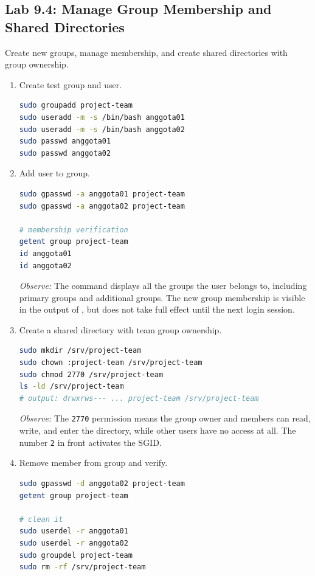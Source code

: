 \subsection*{Lab 9.4: Manage Group Membership and Shared Directories}

Create new groups, manage membership, and create shared directories with group ownership.

\begin{enumerate}
\item Create test group and user.
\begin{lstlisting}[language=bash, caption={Create test groups and users}]
sudo groupadd project-team
sudo useradd -m -s /bin/bash anggota01
sudo useradd -m -s /bin/bash anggota02
sudo passwd anggota01
sudo passwd anggota02
\end{lstlisting}

\item Add user to group.
\begin{lstlisting}[language=bash, caption={Add members to a group}]
sudo gpasswd -a anggota01 project-team
sudo gpasswd -a anggota02 project-team

# membership verification
getent group project-team
id anggota01
id anggota02
\end{lstlisting}

\textit{Observe:} The  command displays all the groups the user belongs to, including primary groups and additional groups. The new group membership is visible in the output of , but does not take full effect until the next login session.

\item Create a shared directory with team group ownership.
\begin{lstlisting}[language=bash, caption={Shared directory for project teams}]
sudo mkdir /srv/project-team
sudo chown :project-team /srv/project-team
sudo chmod 2770 /srv/project-team
ls -ld /srv/project-team
# output: drwxrws--- ... project-team /srv/project-team
\end{lstlisting}

\textit{Observe:} The \texttt{2770} permission means the group owner and members can read, write, and enter the directory, while other users have no access at all. The number \texttt{2} in front activates the SGID.

\item Remove member from group and verify.
\begin{lstlisting}[language=bash, caption={Delete member and verify}]
sudo gpasswd -d anggota02 project-team
getent group project-team

# clean it
sudo userdel -r anggota01
sudo userdel -r anggota02
sudo groupdel project-team
sudo rm -rf /srv/project-team
\end{lstlisting}
\end{enumerate}

